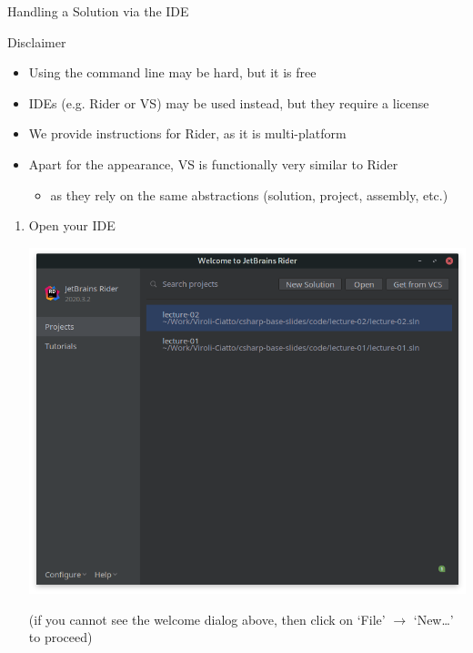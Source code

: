 \documentclass[presentation]{beamer}
\begin{document}
\begin{frame}[allowframebreaks]{Handling a Solution via the IDE}

    \begin{block}{Disclaimer}
        \begin{itemize}
            \item Using the command line may be hard, but it is free
            \item IDEs (e.g. Rider or VS) may be used instead, but they require a license
            \item We provide instructions for Rider, as it is multi-platform
            \item Apart for the appearance, VS is functionally very similar to Rider
            \begin{itemize}
                \item as they rely on the same abstractions (solution, project, assembly, etc.)
            \end{itemize}
        \end{itemize}
    \end{block}

    \framebreak

    \begin{enumerate}
        \item Open your IDE
        \begin{center}
            \includegraphics[width=.6\linewidth]{img/rider-1.png}
        \end{center}
        (if you cannot see the welcome dialog above, then click on \alert{`File'} $\rightarrow$ \alert{`New\ldots'} to proceed)

        \framebreak


\end{enumerate}
\end{frame}
\end{document}
